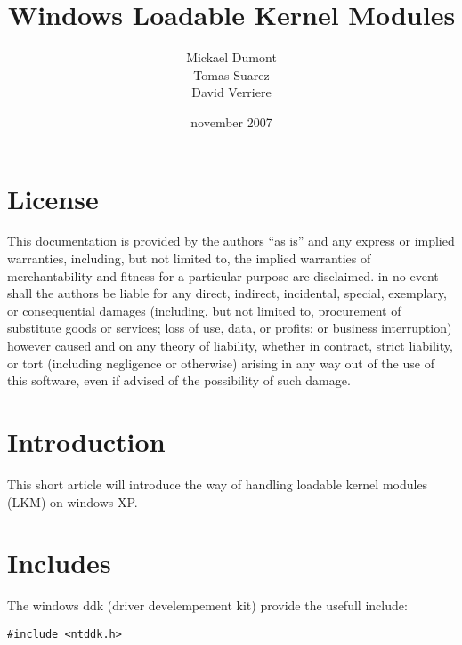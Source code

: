 \documentclass[a4paper,10pt]{article}
\title{Windows Loadable Kernel Modules}
\author{Mickael Dumont\\Tomas Suarez\\David Verriere}
\date{november 2007}
\begin{document}
\pagestyle{plain}

\maketitle
\newpage
\tableofcontents
\newpage

\section{License}
This documentation is provided by the authors ``as is'' and any
express or implied warranties, including, but not limited to, the implied
warranties of merchantability and fitness for a particular purpose are
disclaimed. in no event shall the authors be liable for any
direct, indirect, incidental, special, exemplary, or consequential damages
(including, but not limited to, procurement of substitute goods or services;
loss of use, data, or profits; or business interruption) however caused and
on any theory of liability, whether in contract, strict liability, or tort
(including negligence or otherwise) arising in any way out of the use of this
software, even if advised of the possibility of such damage.

\section{Introduction}
This short article will introduce the way of handling
loadable kernel modules (LKM) on windows XP.

\section{Includes}
The windows ddk (driver develempement kit) provide the usefull include:
\begin{lstlisting}
#include <ntddk.h>
\end{lstlisting}
\end{document}
